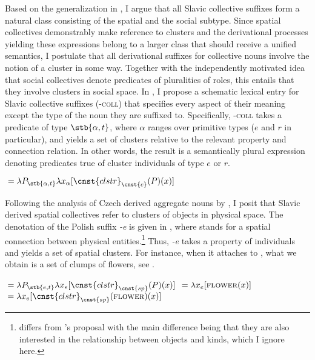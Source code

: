 \documentclass[output=paper]{langscibook}
\begin{document}
Based on the generalization in , I argue that all Slavic collective suffixes form a natural class consisting of the spatial and the social subtype. Since spatial collectives demonstrably make reference to clusters and the derivational processes yielding these expressions belong to a larger class that should receive a unified semantics, I postulate that all derivational suffixes for collective nouns involve the notion of a cluster in some way. Together with the independently motivated idea that social collectives denote predicates of pluralities of roles, this entails that they involve clusters in social space. In , I propose a schematic lexical entry for Slavic collective suffixes (\textsc{-coll}) that specifies every aspect of their meaning except the type of the noun they are suffixed to. Specifically, \mbox{\textsc{-coll}} takes a predicate of type $\stb{\alpha,t}$, where $\alpha$ ranges over primitive types ($e$ and $r$ in particular), and yields a set of clusters relative to the relevant property and connection relation. In other words, the result is a semantically plural expression denoting predicates true of cluster individuals of type $e$ or $r$.

\ea {}${ } =\lambda P_{\stb{\alpha,t}} \lambda x_\alpha[\cnst{clstr}_{\cnst{c}}(P)(x)]$\label{wan:form:coll}
\z

\noindent Following the analysis of Czech derived aggregate nouns by \citet{grimm_docekal-toappear-counting}, I posit that Slavic derived spatial collectives refer to clusters of objects in physical space. The denotation of the Polish suffix \textit{-e} is given in , where  stands for a spatial connection between physical entities.\footnote{ differs from \citeauthor{grimm_docekal-toappear-counting}'s proposal with the main difference being that they are also interested in the relationship between objects and kinds, which I ignore here.} Thus, \textit{-e} takes a property of individuals and yields a set of spatial clusters. For instance, when it attaches to , what we obtain is a set of clumps of flowers, see .

\ea \ea {}${ } =\lambda P_{\stb{e,t}} \lambda x_e[\cnst{clstr}_{\cnst{sp}}(P)(x)]$\label{wan:form:e}
\ex {}${ } =\lambda x_e[\textsc{flower}(x)]$\label{wan:form:kwiat}
\ex {}${ } =\lambda x_e[\cnst{clstr}_{\cnst{sp}}(\textsc{flower})(x)]$\label{wan:form:spatial-cluster}
\z
\z
\end{document}
